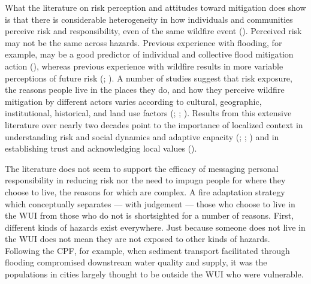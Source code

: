 \documentclass[
]{article}
\begin{document}
What the literature on risk perception and attitudes toward mitigation does show is that there is considerable heterogeneity in how individuals and communities perceive risk and responsibility, even of the same wildfire event (). Perceived risk may not be the same across hazards. Previous experience with flooding, for example, may be a good predictor of individual and collective flood mitigation action (), whereas previous experience with wildfire results in more variable perceptions of future risk (; ). A number of studies suggest that risk exposure, the reasons people live in the places they do, and how they perceive wildfire mitigation by different actors varies according to cultural, geographic, institutional, historical, and land use factors (; ; ). Results from this extensive literature over nearly two decades point to the importance of localized context in understanding risk and social dynamics and adaptive capacity (; ; ) and in establishing trust and acknowledging local values ().

The literature does not seem to support the efficacy of messaging personal responsibility in reducing risk nor the need to impugn people for where they choose to live, the reasons for which are complex. A fire adaptation strategy which conceptually separates --- with judgement --- those who choose to live in the WUI from those who do not is shortsighted for a number of reasons. First, different kinds of hazards exist everywhere. Just because someone does not live in the WUI does not mean they are not exposed to other kinds of hazards. Following the CPF, for example, when sediment transport facilitated through flooding compromised downstream water quality and supply, it was the populations in cities largely thought to be outside the WUI who were vulnerable.
\end{document}
